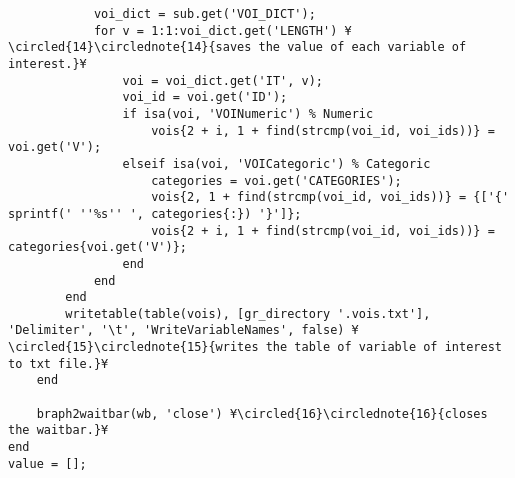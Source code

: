 \documentclass{tufte-handout}
\begin{document}
\begin{lstlisting}
            voi_dict = sub.get('VOI_DICT');
            for v = 1:1:voi_dict.get('LENGTH') ¥\circled{14}\circlednote{14}{saves the value of each variable of interest.}¥
                voi = voi_dict.get('IT', v);
                voi_id = voi.get('ID');
                if isa(voi, 'VOINumeric') % Numeric
                    vois{2 + i, 1 + find(strcmp(voi_id, voi_ids))} = voi.get('V');
                elseif isa(voi, 'VOICategoric') % Categoric
                    categories = voi.get('CATEGORIES');
                    vois{2, 1 + find(strcmp(voi_id, voi_ids))} = {['{' sprintf(' ''%s'' ', categories{:}) '}']}; 
                    vois{2 + i, 1 + find(strcmp(voi_id, voi_ids))} = categories{voi.get('V')};
                end
            end
        end
        writetable(table(vois), [gr_directory '.vois.txt'], 'Delimiter', '\t', 'WriteVariableNames', false) ¥\circled{15}\circlednote{15}{writes the table of variable of interest to txt file.}¥
    end
    
    braph2waitbar(wb, 'close') ¥\circled{16}\circlednote{16}{closes the waitbar.}¥
end
value = [];

\end{lstlisting}
\end{document}
